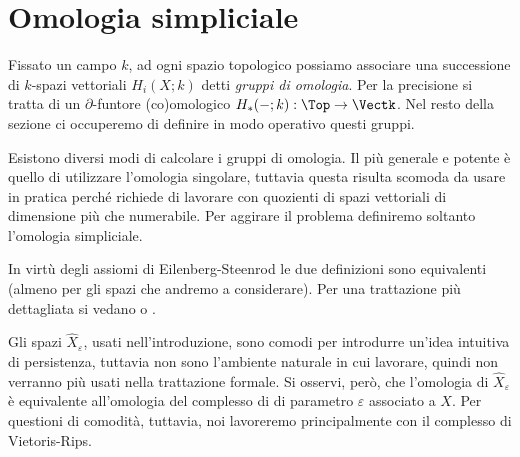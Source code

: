 \clearpage

\section{Omologia simpliciale}

\begin{sloppypar}
  Fissato un campo $k$, ad ogni spazio topologico possiamo associare una successione di $k$-spazi vettoriali $H_i(X;k)$ detti \emph{gruppi di omologia}. Per la precisione si tratta di un $\partial$-funtore (co)omologico ${H_*(-;k):\Top \to \Vectk}$. Nel resto della sezione ci occuperemo di definire in modo operativo questi gruppi.
\end{sloppypar}

Esistono diversi modi di calcolare i gruppi di omologia. Il più generale e potente è quello di utilizzare l'omologia singolare, tuttavia questa risulta scomoda da usare in pratica perché richiede di lavorare con quozienti di spazi vettoriali di dimensione più che numerabile. Per aggirare il problema definiremo soltanto l'omologia simpliciale.

In virtù degli assiomi di Eilenberg-Steenrod \cite{Eilenberg1945, Eilenberg} le due definizioni sono equivalenti (almeno per gli spazi che andremo a considerare). Per una trattazione più dettagliata si vedano \cite{Hatcher2015} o \cite{Rotman1988}.

Gli spazi $\widehat{X}_\varepsilon$, usati nell'introduzione, sono comodi per introdurre un'idea intuitiva di persistenza, tuttavia non sono l'ambiente naturale in cui lavorare, quindi non verranno più usati nella trattazione formale. Si osservi, però, che l'omologia di $\widehat{X}_\varepsilon$ è equivalente all'omologia del complesso di \vCech di parametro $\varepsilon$ associato a $X$. Per questioni di comodità, tuttavia, noi lavoreremo principalmente con il complesso di Vietoris-Rips.

